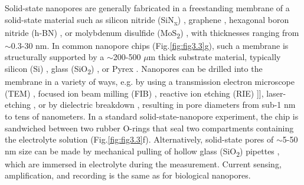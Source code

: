 Solid-state nanopores are generally fabricated in a freestanding membrane of a solid-state material such as silicon nitride (SiN\textsubscript{x}) \cite{Gibb2013}, graphene \cite{Merchant2010}, hexagonal boron nitride (h-BN) \cite{Gilbert2017}, or molybdenum disulfide (MoS\textsubscript{2}) \cite{Graf2019}, with thicknesses ranging from $\sim$0.3-30 nm. In common nanopore chips (Fig.\ref{fig:fig3.3}g), such a membrane is structurally supported by a $\sim$200-500 $\mu$m thick substrate material, typically silicon (Si) \cite{Gibb2013}, glass (SiO\textsubscript{2}) \cite{Balan2014}, or Pyrex \cite{Lee2014,Pitchford2015}. Nanopores can be drilled into the membrane in a variety of ways, e.g. by using a transmission electron microscope (TEM) \cite{Storm2003,VanDenHout2010}, focused ion beam milling (FIB) \cite{Lanyon2007,Schiedt2010}, reactive ion etching (RIE) ]\cite{Verschueren2018}], laser-etching \cite{Gilboa2019,Gilboa2018}, or by dielectric breakdown \cite{Pud2015,Kwok2014}, resulting in pore diameters from sub-1 nm to tens of nanometers. In a standard solid-state-nanopore experiment, the chip is sandwiched between two rubber O-rings that seal two compartments containing the electrolyte solution (Fig.\ref{fig:fig3.3}f). Alternatively, solid-state pores of $\sim$5-50 nm size can be made by mechanical pulling of hollow glass (SiO\textsubscript{2}) pipettes \cite{Piper2006,Xu2017,Bafna2016}, which are immersed in electrolyte during the measurement. Current sensing, amplification, and recording is the same as for biological nanopores. 




